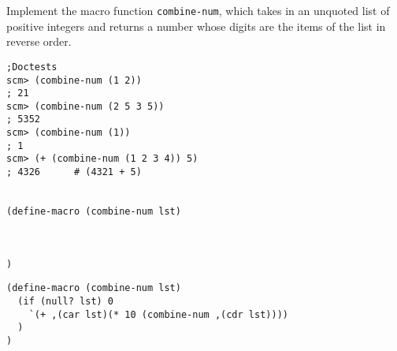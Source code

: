 \begin{blocksection}
\question
Implement the macro function \lstinline{combine-num}, which takes in an unquoted list of positive integers and returns a number whose digits are the items of the list in reverse order. 

\begin{lstlisting}
;Doctests
scm> (combine-num (1 2)) 
; 21
scm> (combine-num (2 5 3 5)) 
; 5352
scm> (combine-num (1)) 
; 1
scm> (+ (combine-num (1 2 3 4)) 5)
; 4326      # (4321 + 5)


(define-macro (combine-num lst) 



)

\end{lstlisting}
\end{blocksection}

\begin{solution}
\begin{blocksection}
\begin{lstlisting}
(define-macro (combine-num lst) 
  (if (null? lst) 0 
    `(+ ,(car lst)(* 10 (combine-num ,(cdr lst))))
  )
)

\end{lstlisting}
\end{blocksection}
\end{solution}